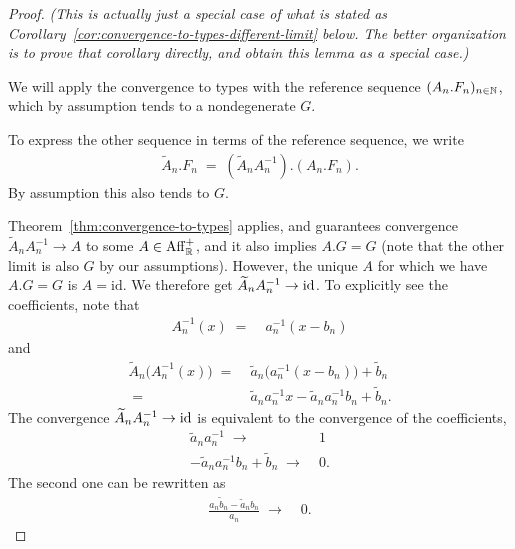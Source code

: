 \begin{proof}
  \emph{(This is actually just a special case of what is stated as
  Corollary~\ref{cor:convergence-to-types-different-limit} below.
  The better organization is to prove that corollary
  directly, and obtain this lemma as a special case.)}

  We will apply the convergence to types with the reference sequence
  $(A_n.F_n)_{n \in \mathbb{N}}$, which by assumption tends to a
  nondegenerate $G$.

  To express the other sequence in terms of the reference sequence, we write
  \begin{align*}
    \widetilde{A}_n.F_n \; = \; (\widetilde{A}_n A_n^{-1}).(A_n.F_n) .
  \end{align*}
  By assumption this also tends to $G$.

  Theorem~\ref{thm:convergence-to-types} applies, and guarantees convergence
  $\widetilde{A}_n A_n^{-1} \to A$ to some $A \in \mathrm{Aff}^+_{\mathbb{R}}$,
  and it also implies $A.G = G$ (note that the other limit is also $G$
  by our assumptions).
  However, the unique $A$ for which we have $A.G = G$ is $A = \mathrm{id}$.
  We therefore get $\widetilde{A}_n A_n^{-1} \to \operatorname{id}$.
  To explicitly see the coefficients, note that
  \begin{align*}
    A_n^{-1}(x) \; = \; & a_n^{-1} (x - b_n)
  \end{align*}
  and
  \begin{align*}
    \widetilde{A}_n \big( A_n^{-1}(x) \big)
    \; = \; & \tilde{a}_n \big(a_n^{-1} (x - b_n)\big) + \tilde{b}_n \\
    \; = \; & \tilde{a}_n a_n^{-1} x - \tilde{a}_n a_n^{-1} b_n + \tilde{b}_n .
  \end{align*}
  The convergence $\widetilde{A}_n A_n^{-1} \to \operatorname{id}$ is equivalent to
  the convergence of the coefficients,
  \begin{align*}
    \tilde{a}_n a_n^{-1} \; \longrightarrow \; & 1 \\
    - \tilde{a}_n a_n^{-1} b_n + \tilde{b}_n \; \longrightarrow \; & 0 .
  \end{align*}
  The second one can be rewritten as
  \begin{align*}
    \frac{a_n \tilde{b}_n - \tilde{a}_n b_n}{a_n} \; \longrightarrow \; & 0 .
  \end{align*}
\end{proof}

